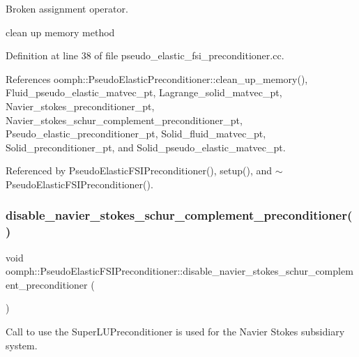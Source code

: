 Broken assignment operator. 

clean up memory method 

Definition at line 38 of file pseudo\+\_\+elastic\+\_\+fsi\+\_\+preconditioner.\+cc.



References oomph\+::\+Pseudo\+Elastic\+Preconditioner\+::clean\+\_\+up\+\_\+memory(), Fluid\+\_\+pseudo\+\_\+elastic\+\_\+matvec\+\_\+pt, Lagrange\+\_\+solid\+\_\+matvec\+\_\+pt, Navier\+\_\+stokes\+\_\+preconditioner\+\_\+pt, Navier\+\_\+stokes\+\_\+schur\+\_\+complement\+\_\+preconditioner\+\_\+pt, Pseudo\+\_\+elastic\+\_\+preconditioner\+\_\+pt, Solid\+\_\+fluid\+\_\+matvec\+\_\+pt, Solid\+\_\+preconditioner\+\_\+pt, and Solid\+\_\+pseudo\+\_\+elastic\+\_\+matvec\+\_\+pt.



Referenced by Pseudo\+Elastic\+F\+S\+I\+Preconditioner(), setup(), and $\sim$\+Pseudo\+Elastic\+F\+S\+I\+Preconditioner().

\mbox{\label{classoomph_1_1PseudoElasticFSIPreconditioner_af2adaec06d407d4b89bca034984c66ba}} 
\subsubsection{\texorpdfstring{disable\+\_\+navier\+\_\+stokes\+\_\+schur\+\_\+complement\+\_\+preconditioner()}{disable\_navier\_stokes\_schur\_complement\_preconditioner()}}
{\footnotesize\ttfamily void oomph\+::\+Pseudo\+Elastic\+F\+S\+I\+Preconditioner\+::disable\+\_\+navier\+\_\+stokes\+\_\+schur\+\_\+complement\+\_\+preconditioner (\begin{DoxyParamCaption}{ }\end{DoxyParamCaption})\hspace{0.3cm}{\ttfamily [inline]}}



Call to use the Super\+L\+U\+Preconditioner is used for the Navier Stokes subsidiary system. 



